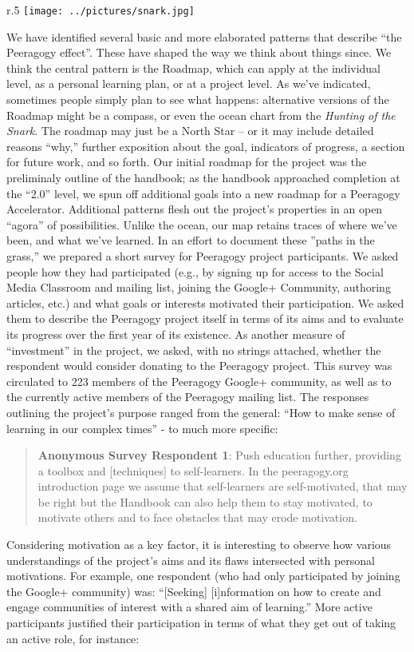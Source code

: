 \begin{wrapfigure}[]{r}{.5\textwidth}
\vspace{-13pt}
\texttt{[image: ../pictures/snark.jpg]}
\vspace{-28pt}
\end{wrapfigure}
We have identified several basic and more elaborated patterns that
describe ``the Peeragogy effect''. These have shaped the way we think
about things since. We think the central pattern is the Roadmap, which
can apply at the individual level, as a personal learning plan, or at a
project level. As we've indicated, sometimes people simply plan to see
what happens: alternative versions of the Roadmap might be a compass, or
even the ocean chart from the \emph{Hunting of the Snark}. The roadmap
may just be a North Star -- or it may include detailed reasons ``why,''
further exposition about the goal, indicators of progress, a section for
future work, and so forth. Our initial roadmap for the project was the
preliminaly outline of the handbook; as the handbook approached
completion at the ``2.0'' level, we spun off additional goals into a new
roadmap for a Peeragogy Accelerator. Additional patterns flesh out the
project's properties in an open ``agora'' of possibilities. Unlike the
ocean, our map retains traces of where we've been, and what we've
learned. In an effort to document these ''paths in the grass,'' we
prepared a short survey for Peeragogy project participants. We asked
people how they had participated (e.g., by signing up for access to the
Social Media Classroom and mailing list, joining the Google+ Community,
authoring articles, etc.) and what goals or interests motivated their
participation. We asked them to describe the Peeragogy project itself in
terms of its aims and to evaluate its progress over the first year of
its existence. As another measure of ``investment'' in the project, we
asked, with no strings attached, whether the respondent would consider
donating to the Peeragogy project. This survey was circulated to 223
members of the Peeragogy Google+ community, as well as to the currently
active members of the Peeragogy mailing list. The responses outlining
the project's purpose ranged from the general: ``How to make sense of
learning in our complex times'' - to much more specific:

\begin{quote}
\textbf{Anonymous Survey Respondent 1}: Push education further,
providing a toolbox and {[}techniques{]} to self-learners. In the
peeragogy.org introduction page we assume that self-learners are
self-motivated, that may be right but the Handbook can also help them to
stay motivated, to motivate others and to face obstacles that may erode
motivation.
\end{quote}
Considering motivation as a key factor, it is interesting to observe how
various understandings of the project's aims and its flaws intersected
with personal motivations. For example, one respondent (who had only
participated by joining the Google+ community) was: ``{[}Seeking{]}
{[}i{]}nformation on how to create and engage communities of interest
with a shared aim of learning.'' More active participants justified
their participation in terms of what they get out of taking an active
role, for instance:

